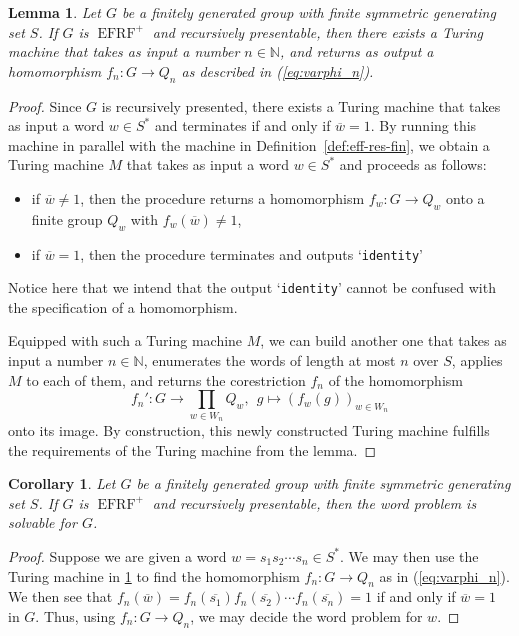 \documentclass[a4paper]{amsart}
\numberwithin{equation}{section}
\newtheorem{corollary}[theorem]{Corollary}
\newtheorem{lemma}[theorem]{Lemma}
\theoremstyle{definition}
\theoremstyle{remark}
\newcommand{\N}{\mathbb{N}}
\DeclareMathOperator{\EFRF}{EFRF}
\begin{document}
\begin{lemma}\label{lem:computable-homos}
Let $G$ be a finitely generated group with finite symmetric generating set $S$.
If $G$ is $\EFRF^{+}$ and recursively presentable, then there exists a Turing machine that takes as input a number $n \in \N$, and returns as output a homomorphism $f_n \colon G \to Q_n$ as described in (\ref{eq:varphi_n}).
\end{lemma}
\begin{proof}
Since $G$ is recursively presented, there exists a Turing machine that takes as input a word $w\in S^*$ and terminates if and only if $\overline w = 1$.
By running this machine in parallel with the machine in Definition~\ref{def:eff-res-fin}, we obtain a Turing machine $M$ that takes as input a word $w\in S^*$ and proceeds as follows:
\begin{itemize}
    \item if $\overline w \neq 1$, then the procedure returns a homomorphism $f_w \colon G \to Q_w$ onto a finite group $Q_w$ with $f_w(\overline{w}) \neq 1$,
    \item if $\overline w = 1$, then the procedure terminates and outputs `\verb!identity!'
\end{itemize}
Notice here that we intend that the output `\verb!identity!' cannot be confused with the specification of a homomorphism.

Equipped with such a Turing machine $M$, we can build another one that takes as input a number $n \in \N$, enumerates the words of length at most $n$ over $S$, applies $M$ to each of them, and returns the corestriction $f_n$ of the homomorphism
\[
    f_n' \colon G \rightarrow \prod \limits_{w \in W_n} Q_w,\ \ g \mapsto (f_w(g))_{w \in W_n}
\]
onto its image.
By construction, this newly constructed Turing machine fulfills the requirements of the Turing machine from the lemma.
\end{proof}

\begin{corollary}\label{cor:computable-wp}
Let $G$ be a finitely generated group with finite symmetric generating set $S$.
If $G$ is $\EFRF^{+}$ and recursively presentable, then the word problem is solvable for $G$.
\end{corollary}

\begin{proof}
Suppose we are given a word $w=s_1s_2\cdots s_n\in S^*$.
We may then use the Turing machine in \cref{lem:computable-homos} to find the homomorphism $f_n\colon G\to Q_n$ as in (\ref{eq:varphi_n}).
We then see that $f_n(\overline{w}) = f_n(\overline{s_1})f_n(\overline{s_2})\cdots f_n(\overline{s_n}) = 1$ if and only if $\overline{w}=1$ in $G$.
Thus, using $f_n\colon G \to Q_n$, we may decide the word problem for $w$.
\end{proof}
\end{document}
